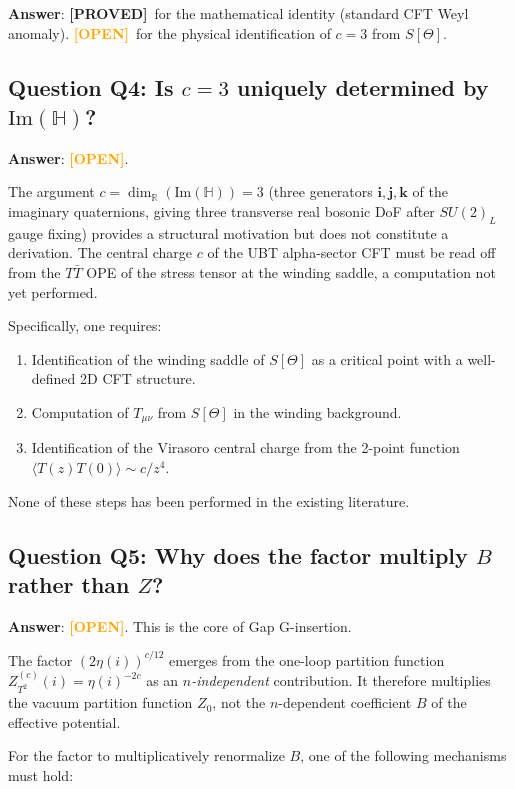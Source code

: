 \documentclass[12pt,a4paper]{article}
\theoremstyle{definition}
\theoremstyle{remark}
\newcommand{\PROVED}{\textcolor{green!60!black}{\textbf{[PROVED]}}}
\newcommand{\OPEN}{\textcolor{orange}{\textbf{[OPEN]}}}
\newcommand{\HH}{\mathbb{H}}
\newcommand{\RR}{\mathbb{R}}
\begin{document}
\noindent\textbf{Answer}: \PROVED\ for the mathematical identity (standard CFT
Weyl anomaly).  \OPEN\ for the physical identification of $c = 3$ from $S[\Theta]$.

\subsection{Question Q4: Is $c = 3$ uniquely determined by $\mathrm{Im}(\HH)$?}
\label{sec:q4}

\noindent\textbf{Answer}: \OPEN.

The argument $c = \dim_\RR(\mathrm{Im}(\HH)) = 3$ (three generators
$\mathbf{i}, \mathbf{j}, \mathbf{k}$ of the imaginary quaternions, giving
three transverse real bosonic DoF after $SU(2)_L$ gauge fixing) provides a
structural motivation but does not constitute a derivation.  The central
charge $c$ of the UBT alpha-sector CFT must be read off from the $T\bar{T}$
OPE of the stress tensor at the winding saddle, a computation not yet
performed.

Specifically, one requires:
\begin{enumerate}
  \item Identification of the winding saddle of $S[\Theta]$ as a critical
        point with a well-defined 2D CFT structure.
  \item Computation of $T_{\mu\nu}$ from $S[\Theta]$ in the winding background.
  \item Identification of the Virasoro central charge from the 2-point function
        $\langle T(z)T(0)\rangle \sim c/z^4$.
\end{enumerate}
None of these steps has been performed in the existing literature.

\subsection{Question Q5: Why does the factor multiply $B$ rather than $Z$?}
\label{sec:q5}

\noindent\textbf{Answer}: \OPEN. This is the core of Gap G-insertion.

The factor $(2\eta(i))^{c/12}$ emerges from the one-loop partition function
$Z^{(c)}_{T^2}(i) = \eta(i)^{-2c}$ as an \emph{$n$-independent} contribution.
It therefore multiplies the vacuum partition function $Z_0$, not the
$n$-dependent coefficient $B$ of the effective potential.

For the factor to multiplicatively renormalize $B$, one of the following
mechanisms must hold:
\end{document}
